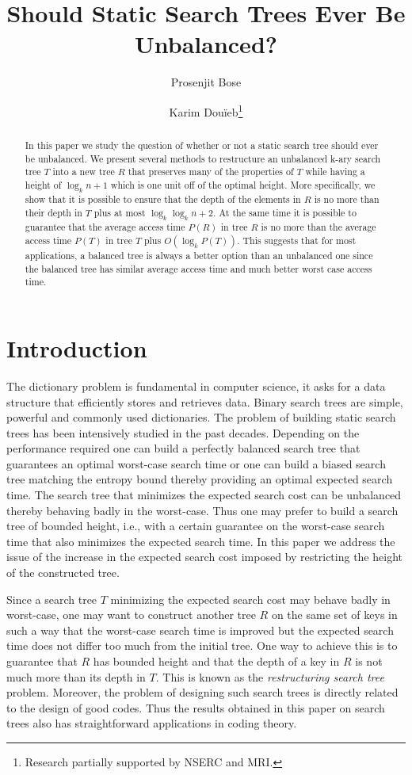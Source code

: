 \documentclass{llncs}\usepackage[english]{babel}
\title{Should Static Search Trees  Ever Be Unbalanced?}
\author{ Prosenjit Bose \and Karim Dou\"ieb\thanks{Research partially supported by NSERC and MRI.}}
\institute{ School of Computer Science, Carleton University, Herzberg Building \\
1125 Colonel By Drive, Ottawa, Ontario, K1S 5B6 Canada \\
\email{\{jit,karim\}@cg.scs.carleton.ca }\\
http://cg.scs.carleton.ca 
}
\date{}
\begin{document}
\sloppy
\maketitle

\begin{abstract}
In this paper we study the question of whether or not a static search tree should ever be unbalanced. We present several methods to restructure an unbalanced k-ary search tree $T$ into a new tree $R$ that preserves many of the properties of $T$ while having a height of $\log_k n +1$ which is one unit off of the optimal height. More specifically, we show that it is possible to ensure that the depth of the elements in $R$ is no more than their depth in $T$ plus at most $\log_k \log_k n +2$. At the same time it is possible to guarantee that the average access time $P(R)$ in tree $R$ is no more than the average access time $P(T)$ in tree $T$ plus $O(\log_k P(T))$. This suggests that for most applications, a balanced tree is always a better option than an unbalanced one since the balanced tree has similar average access time and much better worst case access time.
\end{abstract}

\section{Introduction}
The dictionary problem is fundamental in computer science, it asks for a data structure that efficiently stores and retrieves data. Binary search trees are simple, powerful and commonly used dictionaries.
The problem of building static search trees has been intensively studied in the past decades. Depending on the performance required one can build a perfectly balanced search tree that guarantees an optimal worst-case search time or one can build a biased search tree matching the entropy bound thereby providing an optimal expected search time. The search tree that minimizes the expected search cost can be unbalanced thereby behaving badly in the worst-case. Thus one may prefer to build a search tree of bounded height, i.e., with a certain guarantee on the worst-case search time that also minimizes the expected search time. In this paper we address the issue of the increase in the expected search cost imposed by restricting the height of the constructed tree. 

Since a search tree $T$ minimizing the expected search cost may behave badly in worst-case, one may want to construct another tree $R$ on the same set of keys in such a way that the worst-case search time is improved but the expected search time does not differ too much from the initial tree. One way to achieve this is to guarantee that $R$ has bounded height and that the depth of a key in $R$ is not much more than its depth in $T$. This is known as the \emph{restructuring search tree} problem.  Moreover, the problem of designing such search trees is directly related to the design of good codes. Thus the results obtained in this paper on search trees also has straightforward applications in coding theory.
\end{document}
